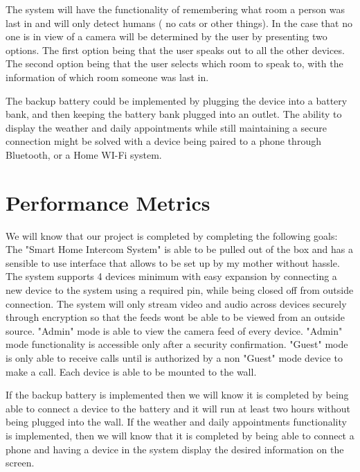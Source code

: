 \documentclass[onecolumn, draftclsnofoot,10pt, compsoc]{IEEEtran}
\begin{document}
The system will have the functionality of remembering what room a person was last in and will only detect humans ( no cats or other things).
In the case that no one is in view of a camera will be determined by the user by presenting two options.
The first option being that the user speaks out to all the other devices.
The second option being that the user selects which room to speak to, with the information of which room someone was last in.

The backup battery could be implemented by plugging the device into a battery bank, and then keeping the battery bank plugged into an outlet. The ability to display the weather and daily appointments while still maintaining a secure connection might be solved with a device being paired to a phone through Bluetooth, or a Home WI-Fi system.


\section{Performance Metrics}
We will know that our project is completed by completing the following goals: 
The "Smart Home Intercom System" is able to be pulled out of the box and has a sensible to use interface that allows to be set up by my mother without hassle. 
The system supports 4 devices minimum with easy expansion by connecting a new device to the system using a required pin, while being closed off from outside connection.
The system will only stream video and audio across devices securely through encryption so that the feeds wont be able to be viewed from an outside source.
"Admin" mode is able to view the camera feed of every device.
"Admin" mode functionality is accessible only after a security confirmation.
"Guest" mode is only able to receive calls until is authorized by a non "Guest" mode device to make a call.
Each device is able to be mounted to the wall.

If the backup battery is implemented then we will know it is completed by being able to connect a device to the battery and it will run at least two hours without being plugged into the wall. 
If the weather and daily appointments functionality is implemented, 
then we will know that it is completed by being able to connect a phone and having a device in the system display the desired information on the screen.
\end{document}
